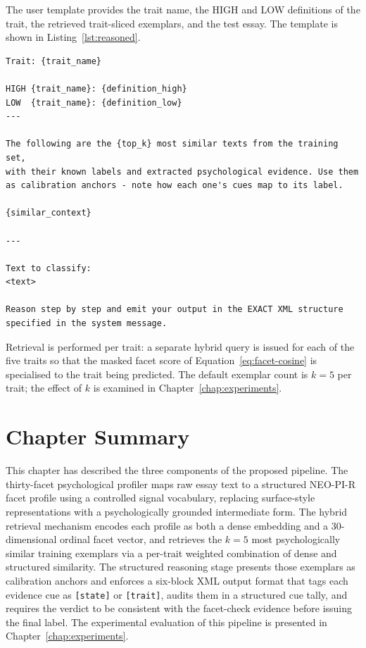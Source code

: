 \documentclass[../main.tex]{subfiles}
\begin{document}
The user template provides the trait name, the HIGH and LOW definitions of the
trait, the retrieved trait-sliced exemplars, and the test essay. The template
is shown in Listing~\ref{lst:reasoned}.

\begin{lstlisting}[style=promptbox,
  caption={Reasoned RAG user template.},
  label={lst:reasoned}]
Trait: {trait_name}

HIGH {trait_name}: {definition_high}
LOW  {trait_name}: {definition_low}
---

The following are the {top_k} most similar texts from the training set,
with their known labels and extracted psychological evidence. Use them
as calibration anchors - note how each one's cues map to its label.

{similar_context}

---

Text to classify:
<text>

Reason step by step and emit your output in the EXACT XML structure
specified in the system message.
\end{lstlisting}

Retrieval is performed per trait: a separate hybrid query is issued for each
of the five traits so that the masked facet score of
Equation~\eqref{eq:facet-cosine} is specialised to the trait being predicted.
The default exemplar count is $k = 5$ per trait; the effect of $k$ is examined
in Chapter~\ref{chap:experiments}.

\section{Chapter Summary}
\label{sec:methodology-summary}

This chapter has described the three components of the proposed pipeline.
The thirty-facet psychological profiler maps raw essay text to a structured
NEO-PI-R facet profile using a controlled signal vocabulary, replacing
surface-style representations with a psychologically grounded intermediate
form. The hybrid retrieval mechanism encodes each profile as both a dense
embedding and a 30-dimensional ordinal facet vector, and retrieves the
$k=5$ most psychologically similar training exemplars via a per-trait
weighted combination of dense and structured similarity. The structured
reasoning stage presents those exemplars as calibration anchors and
enforces a six-block XML output format that tags each evidence cue as
\texttt{[state]} or \texttt{[trait]}, audits them in a structured cue tally,
and requires the verdict to be consistent with the facet-check evidence
before issuing the final label. The experimental evaluation of this pipeline
is presented in Chapter~\ref{chap:experiments}.
\end{document}
